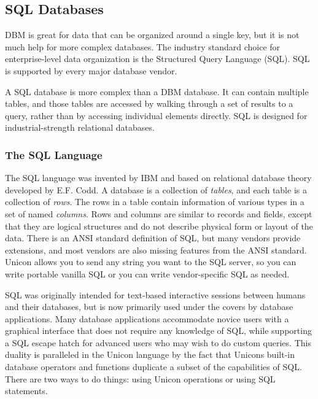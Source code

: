 \subsection[SQL Databases]{SQL Databases}

DBM is great for data that can be organized around a single
key, but it is not much help for more complex databases. The industry
standard choice for enterprise-level data organization is the
Structured Query Language (SQL). SQL is supported by every major
database vendor.

A SQL database is more complex than a DBM database. It can contain
multiple tables, and those tables are accessed by walking through a set
of results to a query, rather than by accessing individual elements
directly. SQL is designed for industrial-strength relational databases.

\subsubsection{The SQL Language}

The SQL language was invented by IBM and based on relational database
theory developed by E.F. Codd. A database is a collection of
\textit{tables}, and each table is a collection of \textit{rows}. The
rows in a table contain information of various types in a set of named
\textit{columns}. Rows and columns are similar to records and fields,
except that they are logical structures and do not describe physical
form or layout of the data. There is an ANSI standard definition of
SQL, but many vendors provide extensions, and most vendors are also
missing features from the ANSI standard. Unicon allows you to send any
string you want to the SQL server, so you can write portable
{\textquotedbl}vanilla SQL{\textquotedbl} or you can write
vendor-specific SQL as needed.

SQL was originally intended for text-based interactive sessions between
humans and their databases, but is now primarily used
{\textquotedbl}under the covers{\textquotedbl} by database
applications. Many database applications accommodate novice users with
a graphical interface that does not require any knowledge of SQL, while
supporting a SQL {\textquotedbl}escape hatch{\textquotedbl} for
advanced users who may wish to do custom queries. This duality is
paralleled in the Unicon language by the fact that
Unicon{\textquotesingle}s built-in database operators and functions
duplicate a subset of the capabilities of SQL. There are two ways to do
things: using Unicon operations or using SQL statements.

